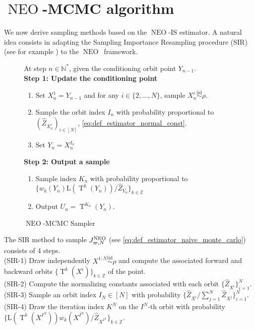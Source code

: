 \documentclass{article}
\def\simiid{\overset{\operatorname{iid}}{\sim}}
\def\IFIS{\ensuremath{\operatorname{NEO}}}
\def\InFiNE{{\small \IFIS}}
\def\NEO{{\small \IFIS}}
\def\transfo{\operatorname{T}}
\def\nsets{\mathbb{N}^*}
\newcommand{\1}{\mathds{1}}
\newcommand{\chunku}[3]{#1^{#2:#3}}
\newcommand{\estConstC}[1]{\widehat{Z}_{#1}}
\def\zset{\mathbb{Z}}
\def\nsets{\mathbb{N}^*}
\def\likelihood{\mathrm{L}}
\def\infineSNIS{J^{\NEO}_{\varpi,N}}
\begin{document}
\section{\IFIS-MCMC algorithm}
\label{sec:mcmc}
We now derive sampling methods based on the \IFIS-IS estimator. 
A  natural idea consists in adapting the Sampling Importance Resampling procedure (SIR) (see for example \cite{rubin1987comment,skare2003improved}) to the \InFiNE\ framework.
\begin{figure}%
\begin{algorithm}[H]
At step $n \in \nsets$, given the conditioning orbit point $Y_{n-1}$.\\
\textbf{Step 1: Update the conditioning point} 
\begin{enumerate}
\item \label{algo:gibbs_partial_1} Set $X^{1}_{n} = Y_{n-1}$ and for any
  $i \in \{2,\dots,N\}$, sample $X_{n}^{i}\simiid \rho$. 
\item Sample the orbit index $I_{n}$  with probability proportional to
$(\estConstC{X_{n}^{i}})_{i \in [N]}$, \eqref{eq:def_estimator_normal_const}.
\item Set $Y_{n} = X^{I_{n}}_{n}$
\end{enumerate}
\textbf{Step 2: Output a sample}
\begin{enumerate}[resume] 
\item Sample index $K_{n}$ with probability proportional to $\{w_k(Y_{n})
\likelihood(\transfo^k(Y_{n}))/ \estConstC{Y_{n}}\}_{k\in\zset}$
\item Output $U_{n}= \transfo^{K_{n}}(Y_{n})$. 
\end{enumerate}
\caption{\InFiNE-MCMC Sampler}
\label{algo:gibbs_partial}
\end{algorithm}
\end{figure}
The SIR method  to sample $\infineSNIS$ (see  \eqref{eq:def_estimator_naive_monte_carlo}) consists of 4 steps. 
\\(SIR-1) Draw independently $\chunku{X}{1}{N}\simiid\rho$ and compute the associated forward and backward orbits $\{ \transfo^k(X^i)\}_{k \in \zset}$ of the point.
\\(SIR-2) Compute the normalizing constants associated with each orbit $\{\estConstC{X^i} \}_{i=1}^N$.
\\(SIR-3) Sample  an orbit index $I_N \in[N]$ with probability $\{\estConstC{X^i}/{\sum_{j=1}^N \estConstC{X^j}}\}_{i=1}^N$.
\\(SIR-4) Draw the iteration index $K^N$ on the $I^N$-th orbit with probability $\{ \likelihood(\transfo^{k}(X^{I^N})) w_k(X^{I^N})/{\estConstC{X^{I^N}}} \}_{k \in \zset}$.
\end{document}
